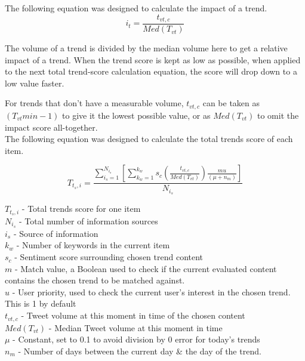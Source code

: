 \documentclass[manuscript,natbib=false]{acmart}
\begin{document}
The following equation was designed to calculate the impact of a trend.
\begin{equation}
i_{t} = \frac{t_{vt,c}}{Med(T_{vt})}
\end{equation}

The volume of a trend is divided by the median volume here to get a relative impact of a trend. When the trend score is kept as low as possible, when applied to the next total trend-score calculation equation, the score will drop down to a low value faster.

For trends that don't have a measurable volume, $t_{vt,c}$ can be taken as $\left(T_{vt}{min} - 1\right)$ to give it the lowest possible value, or as $Med(T_{vt})$ to omit the impact score all-together.\\

The following equation was designed to calculate the total trends score of each item.

\begin{equation}
T_{t_{s},i} = \frac{\sum^{N_{i_{s}}}_{i_{s}=1} \left[\sum^{k_{w}}_{k_{w}=1} s_{c} \left(\frac{t_{vt,c}}{Med(T_{vt})}\right) \frac{m u}{\left(\mu + n_{m}\right)} \right]}{N_{i_{s}}}
\end{equation}

\noindent$T_{t_{s},i}$ - Total trends score for one item\\
$N_{i_{s}}$ - Total number of information sources\\
$i_{s}$ - Source of information\\
$k_{w}$ - Number of keywords in the current item\\
$s_{c}$ - Sentiment score surrounding chosen trend content\\
$m$ - Match value, a Boolean used to check if the current evaluated content contains the chosen trend to be matched against. \\
$u$ - User priority, used to check the current user's interest in the chosen trend. This is 1 by default\\
$t_{vt,c}$ - Tweet volume at this moment in time of the chosen content \\
$Med(T_{vt})$ - Median Tweet volume at this moment in time\\
$\mu$ - Constant, set to 0.1 to avoid division by 0 error for today's trends\\
$n_{m}$ - Number of days between the current day \& the day of the trend.\\
\end{document}
